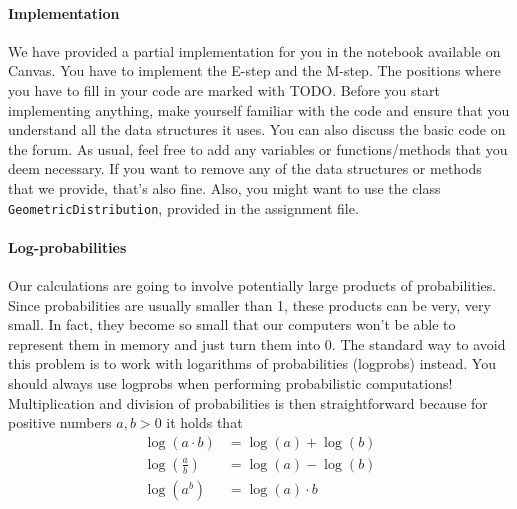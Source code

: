 \documentclass[11pt, a4paper]{article}
\begin{document}
\paragraph{Implementation}

We have provided a partial implementation for you in the notebook available on Canvas.
You have to implement the E-step and the M-step. The positions where you have to fill in your code are marked with TODO. Before you start implementing anything,
make yourself familiar with the code and ensure that you understand all the data structures it uses. You can also discuss the basic code on the forum. As usual, feel
free to add any variables or functions/methods that you deem necessary. If you want to remove any of the data structures or methods that we provide, that's also fine.
Also, you might want to use the class \texttt{GeometricDistribution}, provided in the assignment file.


\paragraph{Log-probabilities}

Our calculations are going to involve potentially large products of probabilities. Since
probabilities are usually smaller than 1, these products can be very, very small. In fact, they become so small that our computers won't be able to 
represent them in memory and just turn them into 0.
The standard way to avoid this problem is to work with logarithms of probabilities (logprobs) instead. You should always use logprobs when performing
probabilistic computations! Multiplication and division of probabilities is then straightforward because for positive numbers $ a,b > 0 $ it holds that
\begin{align*}
\log(a \cdot b) &= \log(a) + \log(b) \\
\log\left( \frac{a}{b} \right) &= \log(a) - \log(b) \\
\log\left( a^{b} \right) &= \log(a) \cdot b
\end{align*}
\end{document}
